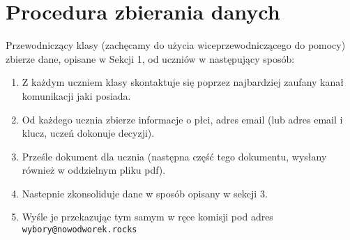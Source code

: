 \section{Procedura zbierania danych}

Przewodniczący klasy (zachęcamy do użycia wiceprzewodniczącego do pomocy) zbierze dane, opisane w Sekcji 1, od uczniów w następujący sposób:

\begin{enumerate}[label=(\arabic*)]%
  \item Z każdym uczniem klasy skontaktuje się poprzez najbardziej zaufany kanał komunikacji jaki posiada.
  \item Od każdego ucznia zbierze informacje o płci, adres email (lub adres email i klucz, uczeń dokonuje decyzji).
  \item Prześle dokument dla ucznia (następna część tego dokumentu, wysłany również w oddzielnym pliku pdf).
  \item Nastepnie zkonsoliduje dane w sposób opisany w sekcji 3.
  \item Wyśle je przekazując tym samym w ręce komisji pod adres \texttt{wybory@nowodworek.rocks}
\end{enumerate}
